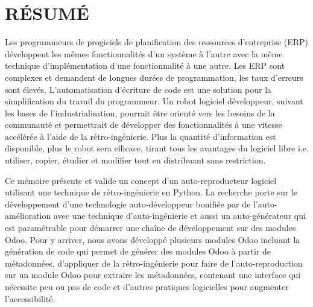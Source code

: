 %
\chapter*{RÉSUMÉ}\thispagestyle{headings}

Les programmeurs de progiciels de planification des ressources d’entreprise (ERP) développent les mêmes fonctionnalités d’un système à l’autre avec la même technique d’implémentation d’une fonctionnalité à une autre. Les ERP sont complexes et demandent de longues durées de programmation, les taux d’erreurs sont élevés. L’automatisation d’écriture de code est une solution pour la simplification du travail du programmeur. Un robot logiciel développeur, suivant les bases de l’industrialisation, pourrait être orienté vers les besoins de la communauté et permettrait de développer des fonctionnalités à une vitesse accélérée à l’aide de la rétro-ingénierie. Plus la quantité d’information est disponible, plus le robot sera efficace, tirant tous les avantages du logiciel libre i.e. utiliser, copier, étudier et modifier tout en distribuant sans restriction.





Ce mémoire présente et valide un concept d'un auto-reproducteur logiciel utilisant une technique de rétro-ingénierie en Python. La recherche porte sur le développement d'une technologie auto-développeur bonifiée par de l'auto-amélioration avec une technique d'auto-ingénierie et aussi un auto-générateur qui est paramétrable pour démarrer une chaîne de développement sur des modules Odoo. Pour y arriver, nous avons développé plusieurs modules Odoo incluant la génération de code qui permet de générer des modules Odoo à partir de métadonnées, d'appliquer de la rétro-ingénierie pour faire de l'auto-reproduction sur un module Odoo pour extraire les métadonnées, contenant une interface qui nécessite peu ou pas de code et d'autres pratiques logicielles pour augmenter l'accessibilité. 

